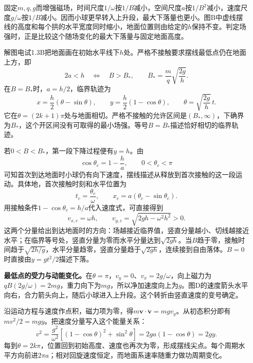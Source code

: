 \documentclass[UTF8,fontset=fandol,a4paper,11pt]{ctexart}
\newcommand{\figcaption}[1]{\par\vspace{2pt}{\small\color{muted}#1}\par}
\begin{document}
固定$m,q,g$而增强磁场，时间尺度$1/\omega$按$1/B$减小，空间尺度$a$按$1/B^2$减小，速度尺度$g/\omega$按$1/B$减小。因而小球更早转入上升段，最大下落量也更小。图B中虚线摆线的高度和每个拱的水平宽度同时缩小，地面位置则由给定的$h$保持不变。判定场强时，正是比较这个随场变化的最大下落量与固定地面高度。

解图电试1.3B把地面画在初始水平线下$h$处。严格不接触要求摆线最低点仍在地面上方，即
\[
2a<h
\quad\Longleftrightarrow\quad
\boxed{B>B_*},\qquad
\boxed{B_*=\frac m q\sqrt{\frac{2g}{h}}}.
\]
在$B=B_*$时，$a=h/2$，临界轨迹为
\[
x=\frac h2(\theta-\sin\theta),\qquad
y=\frac h2(1-\cos\theta),\qquad
\theta=\sqrt{\frac{2g}{h}}\,t.
\]
它在$\theta=(2k+1)\pi$处与地面相切。严格不接触的允许区间是$(B_*,\infty)$，下确界为$B_*$，这个开区间没有可取得的最小场强。等号$B=B_*$描述恰好相切的临界轨迹。

若$0<B<B_*$，第一段下降过程便有$y=h$。由
\[
\cos\theta_c=1-\frac h a,\qquad 0<\theta_c<\pi
\]
可知首次到达地面时小球仍有向下速度，摆线描述从释放到首次接触的这一段运动。具体地，首次接触时刻和水平位置为
\[
t_c=\frac{\theta_c}{\omega},\qquad
x_c=a(\theta_c-\sin\theta_c).
\]
用接触条件$1-\cos\theta_c=h/a$代入速度式，可直接得到
\[
v_{x,c}=\omega h,\qquad
v_{y,c}=\sqrt{2gh-\omega^2h^2}>0.
\]
这两个分量给出到达地面时的方向：场越接近临界值，竖直分量越小、切线越接近水平；在临界等号处，竖直分量为零而水平分量达到$\sqrt{2gh}$。当$B$趋于零，接触时间趋于$\sqrt{2h/g}$，水平分量趋零，竖直分量趋于$\sqrt{2gh}$，连续接到自由落体。$B=0$时直接由$y=gt^2/2$描述下落。

\textbf{最低点的受力与动能变化。}在$\theta=\pi$，$v_y=0$、$v_x=2g/\omega$，向上磁力为$qB(2g/\omega)=2mg$，重力向下为$mg$，所以净加速度向上为$g$。图D的速度箭头水平向右，合力箭头向上，随后小球进入上升段。这个转折由竖直速度的变号确定。

\begin{center}\begin{minipage}{.98\linewidth}\centering
{}
\figcaption{解图电试1.3D\quad 最低点的速度、磁力与重力}
\end{minipage}\end{center}
沿运动方程与速度作点积，磁力项为零，得$m\boldsymbol v\cdot\dot{\boldsymbol v}=mgv_y$。从初态积分即有$mv^2/2=mgy$。把速度分量写入这个能量关系：
\[
v^2=\frac{g^2}{\omega^2}
[(1-\cos\theta)^2+\sin^2\theta]
=2ga(1-\cos\theta)=2gy.
\]
每到$\theta=2k\pi$，位置回到初始高度、速度也再次为零，形成摆线尖点。每个周期水平方向前进$2\pi a$；相对回旋速度恒定，而地面系速率随重力做功周期变化。
\end{document}
